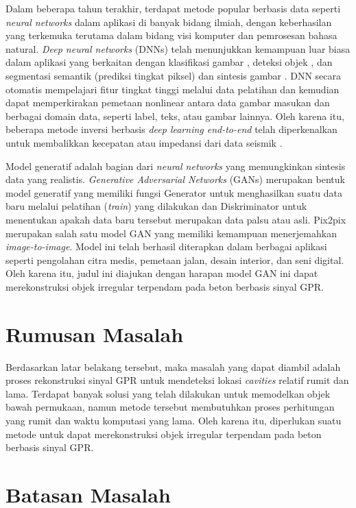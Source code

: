 Dalam beberapa tahun terakhir, terdapat metode popular berbasis data seperti \emph{neural networks} dalam aplikasi di banyak bidang ilmiah, dengan keberhasilan yang terkemuka terutama dalam bidang visi komputer dan pemrosesan bahasa natural. 
\emph{Deep neural networks} (DNNs) telah menunjukkan kemampuan luar biasa dalam aplikasi yang berkaitan dengan klasifikasi gambar \parencite{objectDetection}, deteksi objek \parencite{fasterRCNN}, dan segmentasi semantik (prediksi tingkat piksel) \parencite{difNet} dan sintesis gambar \parencite{GAN}. 
DNN secara otomatis mempelajari fitur tingkat tinggi melalui data pelatihan dan kemudian dapat memperkirakan pemetaan nonlinear antara data gambar masukan dan berbagai domain data, seperti label, teks, atau gambar lainnya. 
Oleh karena itu, beberapa metode inversi berbasis \emph{deep learning end-to-end} telah diperkenalkan untuk membalikkan kecepatan atau impedansi dari data seismik \parencite{gprInvNet}.

Model generatif adalah bagian dari \emph{neural networks} yang memungkinkan sintesis data yang realistis. 
\emph{Generative Adversarial Networks} (GANs) merupakan bentuk model generatif yang memiliki fungsi Generator untuk menghasilkan suatu data baru melalui pelatihan (\emph{train}) yang dilakukan dan Diskriminator untuk menentukan apakah data baru tersebut merupakan data palsu atau asli. 
Pix2pix merupakan salah satu model GAN yang memiliki kemampuan menerjemahkan \emph{image-to-image}. 
Model ini telah berhasil diterapkan dalam berbagai aplikasi seperti pengolahan citra medis, pemetaan jalan, desain interior, dan seni digital. 
Oleh karena itu, judul ini diajukan dengan harapan model GAN ini dapat merekonstruksi objek irregular terpendam pada beton berbasis sinyal GPR.

\section{Rumusan Masalah}
\label{sec:rumusanmasalah}

Berdasarkan latar belakang tersebut, maka masalah yang dapat diambil adalah proses rekonstruksi sinyal GPR untuk mendeteksi lokasi \emph{cavities} relatif rumit dan lama. 
Terdapat banyak solusi yang telah dilakukan untuk memodelkan objek bawah permukaan, namun metode tersebut membutuhkan proses perhitungan yang rumit dan waktu komputasi yang lama. 
Oleh karena itu, diperlukan suatu metode untuk dapat merekonstruksi objek irregular terpendam pada beton berbasis sinyal GPR.

\section{Batasan Masalah}
\label{sec:batasanmasalah}

